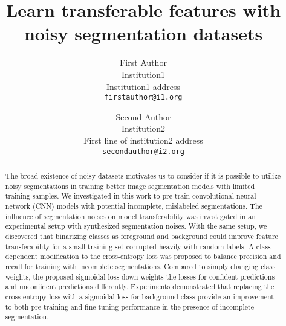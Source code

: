 \documentclass[10pt,twocolumn,letterpaper]{article}
\begin{document}
\onecolumn
{}


\twocolumn
{}
\newpage
\title{Learn transferable features with noisy segmentation datasets}

\author{First Author\\
Institution1\\
Institution1 address\\
{\tt\small firstauthor@i1.org}
\and
Second Author\\
Institution2\\
First line of institution2 address\\
{\tt\small secondauthor@i2.org}
}

\maketitle


\begin{abstract}


The broad existence of noisy datasets motivates us to consider if it is possible to utilize noisy segmentations in training better image segmentation models with limited training samples.
We investigated in this work to pre-train convolutional neural network (CNN) models with potential incomplete, mislabeled segmentations.
The influence of segmentation noises on model transferability was investigated in an experimental setup with synthesized segmentation noises.
With the same setup, we discovered that binarizing classes as foreground and background could improve feature transferability for a small training set corrupted heavily with random labels.
A class-dependent modification to the cross-entropy loss was proposed to balance precision and recall for training with incomplete segmentations.
Compared to simply changing class weights, the proposed sigmoidal loss down-weights the losses for confident predictions and unconfident predictions differently.
Experiments demonstrated that replacing the cross-entropy loss with a sigmoidal loss for background class provide an improvement to both pre-training and fine-tuning performance in the presence of incomplete segmentation.\end{abstract}

















{\small


}

\clearpage

\end{document}
